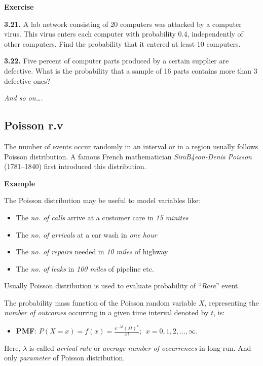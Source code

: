 \documentclass[
]{article}
\providecommand{\tightlist}{%
  \setlength{\itemsep}{0pt}\setlength{\parskip}{0pt}}
\begin{document}
\textbf{Exercise}\citep{baron_probability_2019}

\textbf{3.21.} A lab network consisting of 20 computers was attacked by a computer virus. This virus enters each computer with probability 0.4, independently of other computers. Find the probability that it entered at least 10 computers.

\textbf{3.22.} Five percent of computer parts produced by a certain supplier are defective. What is the probability that a sample of 16 parts contains more than 3 defective ones?

\emph{And so on\ldots.}

\subsection{Poisson r.v}\label{poisson-r.v}

The number of events occur randomly in an interval or in a region usually follows Poisson distribution. A famous French mathematician \emph{SimB4eon-Denis Poisson} (1781--1840) first introduced this distribution.

\textbf{Example}

The Poisson distribution may be useful to model variables like:

\begin{itemize}
\tightlist
\item
  The \emph{no. of calls} arrive at a customer care in \emph{15 minites}
\item
  The \emph{no. of arrivals} at a car wash in \emph{one hour}
\item
  The \emph{no. of repairs} needed in \emph{10 miles} of highway
\item
  The \emph{no. of leaks} in \emph{100 miles} of pipeline etc.
\end{itemize}

Usually Poisson distribution is used to evaluate probability of ``\emph{Rare}'' event.

The probability mass function of the Poisson random variable \(X\), representing the \emph{number of outcomes} occurring in a given time interval denoted by \(t\), is:

\begin{itemize}
\tightlist
\item
  \textbf{PMF}: \(P(X=x)=f(x)=\frac{e^{-\lambda t}(\lambda t)^x}{x!}; \ \ x=0,1,2,...,\infty.\)
\end{itemize}

Here, \(\lambda\) is called \emph{arrival rate} or \emph{average number of occurrences} in long-run. And only \emph{parameter} of Poisson distribution.
\end{document}
